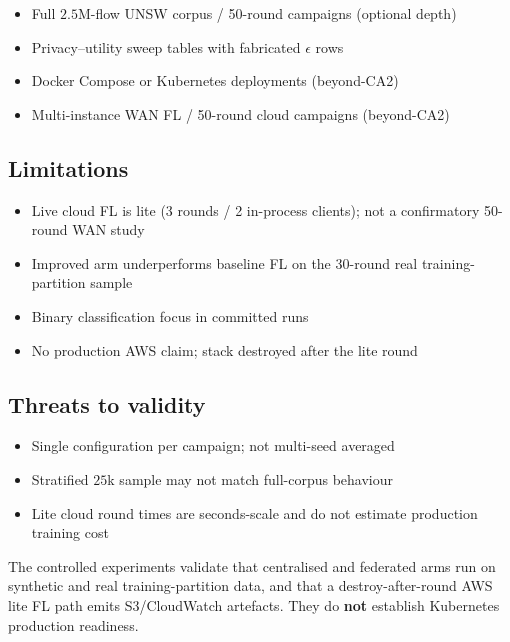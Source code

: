 \begin{itemize}
    \item Full $2.5$M-flow UNSW corpus / 50-round campaigns (optional depth)
    \item Privacy--utility sweep tables with fabricated $\epsilon$ rows
    \item Docker Compose or Kubernetes deployments (beyond-CA2)
    \item Multi-instance WAN FL / 50-round cloud campaigns (beyond-CA2)
\end{itemize}

\subsection{Limitations}

\begin{itemize}
    \item Live cloud FL is lite (3 rounds / 2 in-process clients); not a confirmatory 50-round WAN study
    \item Improved arm underperforms baseline FL on the 30-round real training-partition sample
    \item Binary classification focus in committed runs
    \item No production AWS claim; stack destroyed after the lite round
\end{itemize}

\subsection{Threats to validity}

\begin{itemize}
    \item Single configuration per campaign; not multi-seed averaged
    \item Stratified $25$k sample may not match full-corpus behaviour
    \item Lite cloud round times are seconds-scale and do not estimate production training cost
\end{itemize}

The controlled experiments validate that centralised and federated arms run on synthetic and real training-partition data, and that a destroy-after-round AWS lite FL path emits S3/CloudWatch artefacts. They do \textbf{not} establish Kubernetes production readiness.
